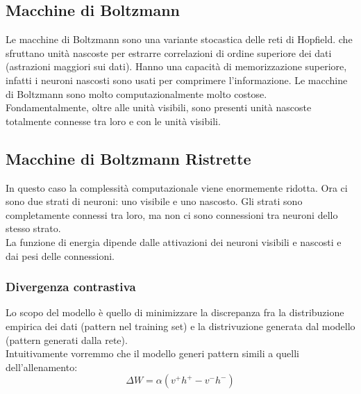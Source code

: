 \subsection{Macchine di Boltzmann}

Le macchine di Boltzmann sono una variante stocastica delle reti di Hopfield.
che sfruttano unità nascoste per estrarre correlazioni di ordine superiore dei
dati (astrazioni maggiori sui dati).
Hanno una capacità di memorizzazione superiore, infatti i neuroni nascosti sono
usati per comprimere l'informazione.
Le macchine di Boltzmann sono molto computazionalmente molto costose.\\
Fondamentalmente, oltre alle unità visibili, sono presenti unità nascoste
totalmente connesse tra loro e con le unità visibili.

\subsection{Macchine di Boltzmann Ristrette}
 
 In questo caso la complessità computazionale viene enormemente ridotta. Ora ci
 sono due strati di neuroni: uno visibile e uno nascosto. Gli strati sono
 completamente connessi tra loro, ma non ci sono connessioni tra neuroni dello
 stesso strato.\\
 La funzione di energia dipende dalle attivazioni dei neuroni visibili e 
 nascosti e dai pesi delle connessioni.

\subsubsection{Divergenza contrastiva}

Lo scopo del modello è quello di minimizzare la discrepanza fra la distribuzione
empirica dei dati (pattern nel training set) e la distrivuzione generata dal
modello (pattern generati dalla rete).\\
Intuitivamente vorremmo che il modello generi pattern simili a quelli
dell'allenamento:
\begin{equation*}
	\Delta W = \alpha(v^{+}h^{+} - v^{-}h^{-})
\end{equation*}

